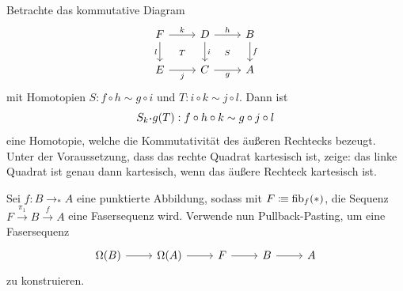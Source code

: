 \documentclass{hott-übung}
\begin{document}
\newpage
{}
  Betrachte das kommutative Diagram
  \[\begin{tikzcd}
  	F & D & B \\
  	E & C & A
  	\arrow["k", from=1-1, to=1-2]
  	\arrow["l"', from=1-1, to=2-1]
  	\arrow["T"{description}, draw=none, from=1-1, to=2-2]
  	\arrow["h", from=1-2, to=1-3]
  	\arrow["i", from=1-2, to=2-2]
  	\arrow["S"{description}, draw=none, from=1-2, to=2-3]
  	\arrow["f", from=1-3, to=2-3]
  	\arrow["j"', from=2-1, to=2-2]
  	\arrow["g"', from=2-2, to=2-3]
  \end{tikzcd}\]
  mit Homotopien \(S : f\circ h \sim g\circ i\) und \(T : i\circ k \sim j \circ l\).
  Dann ist
  \[S_k \kon g(T) : f \circ h \circ k \sim g \circ j \circ l\]
  eine Homotopie, welche die Kommutativität des äußeren Rechtecks bezeugt.
  Unter der Voraussetzung, dass das rechte Quadrat kartesisch ist, zeige: das linke Quadrat ist genau dann kartesisch, wenn das äußere Rechteck kartesisch ist.

\aufgabe{}
  Sei \(f : B \to_\ast A\) eine punktierte Abbildung, sodass mit \(F \vcentcolon\mspace{-1.2mu}\equiv \mathrm{fib}_f(\ast)\), die Sequenz \(F \xrightarrow{\pi_1} B \xrightarrow{f} A\) eine Fasersequenz wird.
  Verwende nun Pullback-Pasting, um eine Fasersequenz
  \[\begin{tikzcd}
    \Omega(B) & \Omega(A) & F & B & A
    \arrow[from=1-1,to=1-2]
    \arrow[from=1-2,to=1-3]
    \arrow[from=1-3,to=1-4]
    \arrow[from=1-4,to=1-5]
  \end{tikzcd}\]
  zu konstruieren.

\end{document}
